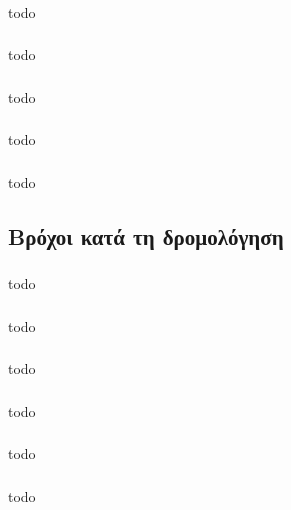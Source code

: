 \documentclass[a4paper, 12pt]{article}
\begin{document}
		\subsubsection{}
			todo

		\subsubsection{}
			todo

		\subsubsection{}
			todo

		\subsubsection{}
			todo

		\subsubsection{}
			todo

	\subsection{Βρόχοι κατά τη δρομολόγηση}

		\subsubsection{}
			todo

		\subsubsection{}
			todo

		\subsubsection{}
			todo

		\subsubsection{}
			todo

		\subsubsection{}
			todo

		\subsubsection{}
			todo
\end{document}

